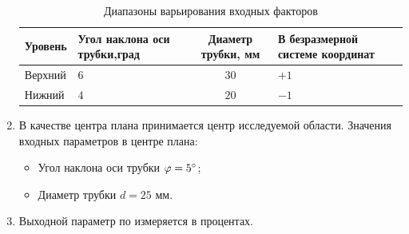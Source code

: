 \documentclass[../../AISTR.tex]{subfiles}
\begin{document}
\begin{enumerate}
\begin{table}[H]\label{tab:diapazon}
	\centering
	\begin{tabular}{|l|C{4cm}|c|C{5cm}|}
	\hline
	Уровень & Угол наклона оси трубки,град & Диаметр трубки, мм & В безразмерной системе координат\\
	\hline
	Верхний & $6$ & $30$ & $+1$ \\
	\hline
	Нижний & $4$ & $20$ & $-1$ \\
	\hline
\end{tabular}
\caption{Диапазоны варьирования входных факторов}
\end{table}
	\item В качестве центра плана принимается центр исследуемой области. Значения входных параметров в центре плана:
	\begin{itemize}
		\item Угол наклона оси трубки $\varphi=5^\circ$;
		\item Диаметр трубки $d = 25$ мм.
	\end{itemize}
	\item Выходной параметр по  измеряется в процентах.
\end{enumerate}
\end{document}

